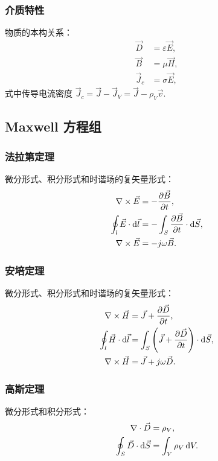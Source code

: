 \documentclass[Chinese, use boldface, twocolumn]{lebhart}
\numberwithin{equation}{section}
\begin{document}
\subsubsection{介质特性}
物质的本构关系：
\begin{subequations}
  \begin{align}
    \vec{D}&=\varepsilon\vec{E},\\
    \vec{B}&=\mu\vec{H},\\
    \vec{J}_c&=\sigma\vec{E},
  \end{align}
\end{subequations}
式中传导电流密度 $\vec{J}_c=\vec{J}-\vec{J}_V=\vec{J}-\rho_V\vec{v}$.

\subsection{Maxwell 方程组}

\subsubsection{法拉第定理}
微分形式、积分形式和时谐场的复矢量形式：
\begin{subequations}
  \begin{align}
    \nabla\times\vec{E}&=-\pdv{\vec{B}}{t},\label{eq:Faraday_d}\\
    \oint_l\vec{E}\cdot\odif{\vec{l}}&=-\int_S\pdv{\vec{B}}{t}\cdot\odif{\vec{S}},\\
    \nabla\times\vec{E}&=-j\omega\vec{B}.
  \end{align}
\end{subequations}

\subsubsection{安培定理}
微分形式、积分形式和时谐场的复矢量形式：
\begin{subequations}
  \begin{align}
    \nabla\times\vec{H}&=\vec{J}+\pdv{\vec{D}}{t},\\
    \oint_l\vec{H}\cdot\odif{\vec{l}}&=\int_S\left(\vec{J}+\pdv{\vec{D}}{t}\right)\cdot\odif{\vec{S}},\\
    \nabla\times\vec{H}&=\vec{J}+j\omega\vec{D}.
  \end{align}
\end{subequations}

\subsubsection{高斯定理}
微分形式和积分形式：
\begin{subequations}
  \begin{align}
    \nabla\cdot\vec{D}&=\rho_V,\\
    \oint_S\vec{D}\cdot\odif{\vec{S}}&=\int_V\rho_V\odif{V}.
  \end{align}
\end{subequations}
\end{document}
